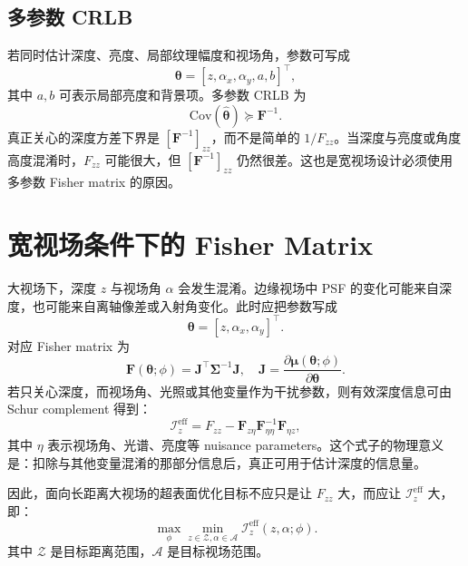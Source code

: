 \documentclass[11pt,a4paper,fontset=none]{ctexart}
\begin{document}
\subsection{多参数 CRLB}

若同时估计深度、亮度、局部纹理幅度和视场角，参数可写成
\begin{equation}
  \bm\theta=[z,\alpha_x,\alpha_y,a,b]^\top,
\end{equation}
其中 $a,b$ 可表示局部亮度和背景项。多参数 CRLB 为
\begin{equation}
  \mathrm{Cov}(\hat{\bm\theta})
  \succeq
  \bm F^{-1}.
\end{equation}
真正关心的深度方差下界是 $\left[\bm F^{-1}\right]_{zz}$，而不是简单的 $1/F_{zz}$。当深度与亮度或角度高度混淆时，$F_{zz}$ 可能很大，但 $\left[\bm F^{-1}\right]_{zz}$ 仍然很差。这也是宽视场设计必须使用多参数 Fisher matrix 的原因。

\section{宽视场条件下的 Fisher Matrix}

大视场下，深度 $z$ 与视场角 $\alpha$ 会发生混淆。边缘视场中 PSF 的变化可能来自深度，也可能来自离轴像差或入射角变化。此时应把参数写成
\begin{equation}
  \bm \theta = [z,\alpha_x,\alpha_y]^\top .
\end{equation}
对应 Fisher matrix 为
\begin{equation}
  \bm F(\bm \theta;\phi)
  =
  \bm J^\top \bm \Sigma^{-1}\bm J,\quad
  \bm J=\frac{\partial \bm \mu(\bm \theta;\phi)}{\partial \bm \theta}.
\end{equation}
若只关心深度，而视场角、光照或其他变量作为干扰参数，则有效深度信息可由 Schur complement 得到：
\begin{equation}
  \mathcal I^{\mathrm{eff}}_z
  =
  F_{zz} -
  \bm F_{z\eta}
  \bm F_{\eta\eta}^{-1}
  \bm F_{\eta z},
  \label{eq:schur}
\end{equation}
其中 $\eta$ 表示视场角、光谱、亮度等 nuisance parameters。这个式子的物理意义是：扣除与其他变量混淆的那部分信息后，真正可用于估计深度的信息量。

因此，面向长距离大视场的超表面优化目标不应只是让 $F_{zz}$ 大，而应让 $\mathcal I^{\mathrm{eff}}_z$ 大，即：
\begin{equation}
  \max_{\phi}
  \min_{z\in \mathcal Z,\alpha\in \mathcal A}
  \mathcal I^{\mathrm{eff}}_z(z,\alpha;\phi).
  \label{eq:maxmin_fisher}
\end{equation}
其中 $\mathcal Z$ 是目标距离范围，$\mathcal A$ 是目标视场范围。
\end{document}
